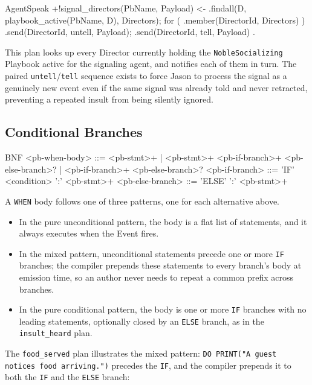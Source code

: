 \begin{codeblock}[]{AgentSpeak}
+!signal_directors(PbName, Payload) <-
    .findall(D, playbook_active(PbName, D), Directors);
    for ( .member(DirectorId, Directors) ) {
        .send(DirectorId, untell, Payload);
        .send(DirectorId, tell, Payload)
    }.
\end{codeblock}

This plan looks up every Director currently holding the \lstinline|NobleSocializing| Playbook active for the signaling agent, and notifies each of them in turn. The paired \lstinline|untell|/\lstinline|tell| sequence exists to force Jason to process the signal as a genuinely new event even if the same signal was already told and never retracted, preventing a repeated insult from being silently ignored.

\subsection{Conditional Branches}
\begin{codeblock}[]{BNF}
    <pb-when-body>      ::= <pb-stmt>+
                          | <pb-stmt>+ <pb-if-branch>+ <pb-else-branch>?
                          | <pb-if-branch>+ <pb-else-branch>?
    <pb-if-branch>      ::= 'IF' <condition> ':' <pb-stmt>+
    <pb-else-branch>    ::= 'ELSE' ':' <pb-stmt>+
\end{codeblock}

A \lstinline|WHEN| body follows one of three patterns, one for each alternative above. 

\begin{itemize}
    \item In the pure unconditional pattern, the body is a flat list of statements, and it always executes when the Event fires.
    \item In the mixed pattern, unconditional statements precede one or more \lstinline|IF| branches; the compiler prepends these statements to every branch's body at emission time, so an author never needs to repeat a common prefix across branches.
    \item In the pure conditional pattern, the body is one or more \lstinline|IF| branches with no leading statements, optionally closed by an \lstinline|ELSE| branch, as in the \lstinline|insult_heard| plan.
\end{itemize}
The \lstinline|food_served| plan illustrates the mixed pattern: \lstinline|DO PRINT("A guest notices food arriving.")| precedes the \lstinline|IF|, and the compiler prepends it to both the \lstinline|IF| and the \lstinline|ELSE| branch:

